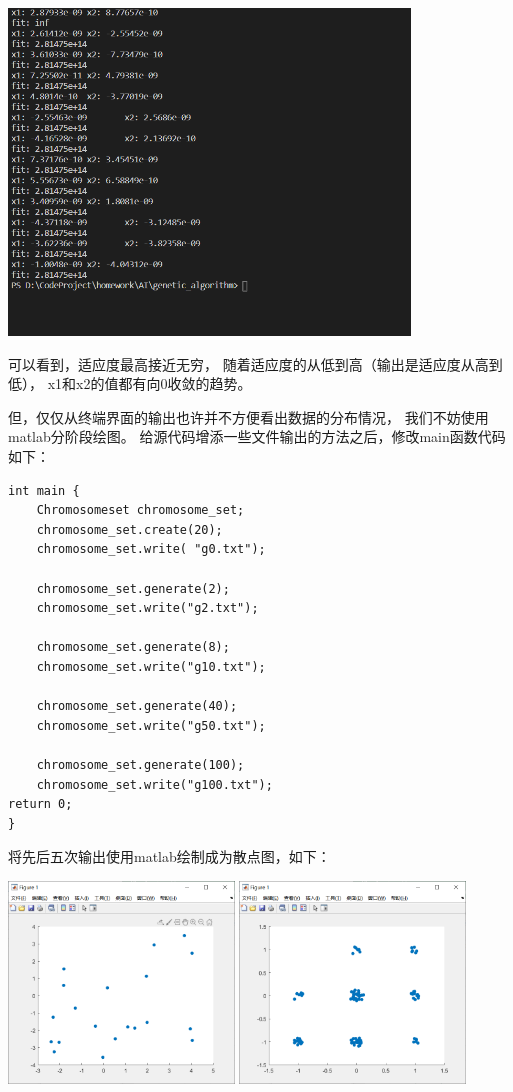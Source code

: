 \documentclass[UTF8]{ctexart}
\begin{document}
\includegraphics[width = 0.8\textwidth]{output_02.png}

可以看到，适应度最高接近无穷，
随着适应度的从低到高（输出是适应度从高到低），
x1和x2的值都有向0收敛的趋势。

但，仅仅从终端界面的输出也许并不方便看出数据的分布情况，
我们不妨使用matlab分阶段绘图。
给源代码增添一些文件输出的方法之后，修改main函数代码如下：

\begin{lstlisting}
int main {
    Chromosomeset chromosome_set;
    chromosome_set.create(20);
    chromosome_set.write( "g0.txt");

    chromosome_set.generate(2);
    chromosome_set.write("g2.txt");

    chromosome_set.generate(8);
    chromosome_set.write("g10.txt");

    chromosome_set.generate(40);
    chromosome_set.write("g50.txt");

    chromosome_set.generate(100);
    chromosome_set.write("g100.txt");
return 0;
}
\end{lstlisting}

将先后五次输出使用matlab绘制成为散点图，如下：

\includegraphics[width = 0.45\textwidth]{test1_01.png}
\includegraphics[width = 0.45\textwidth]{test1_02.png}
\end{document}
